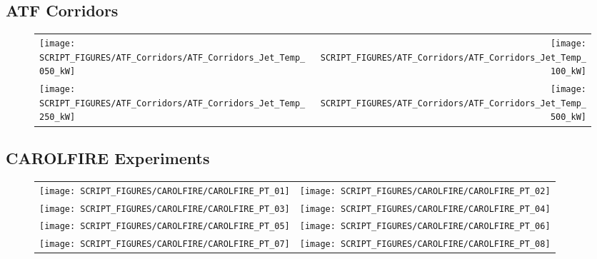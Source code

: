 

\subsection{ATF Corridors}

\begin{figure}[!ht]
\begin{tabular*}{\textwidth}{l@{\extracolsep{\fill}}r}
\texttt{[image: SCRIPT\_FIGURES/ATF\_Corridors/ATF\_Corridors\_Jet\_Temp\_050\_kW]} &
\texttt{[image: SCRIPT\_FIGURES/ATF\_Corridors/ATF\_Corridors\_Jet\_Temp\_100\_kW]} \\
\texttt{[image: SCRIPT\_FIGURES/ATF\_Corridors/ATF\_Corridors\_Jet\_Temp\_250\_kW]} &
\texttt{[image: SCRIPT\_FIGURES/ATF\_Corridors/ATF\_Corridors\_Jet\_Temp\_500\_kW]}
\end{tabular*}
\end{figure}

\clearpage

\subsection{CAROLFIRE Experiments}

\begin{figure}[!ht]
\begin{tabular*}{\textwidth}{l@{\extracolsep{\fill}}r}
\texttt{[image: SCRIPT\_FIGURES/CAROLFIRE/CAROLFIRE\_PT\_01]} &
\texttt{[image: SCRIPT\_FIGURES/CAROLFIRE/CAROLFIRE\_PT\_02]} \\
\texttt{[image: SCRIPT\_FIGURES/CAROLFIRE/CAROLFIRE\_PT\_03]} &
\texttt{[image: SCRIPT\_FIGURES/CAROLFIRE/CAROLFIRE\_PT\_04]} \\
\texttt{[image: SCRIPT\_FIGURES/CAROLFIRE/CAROLFIRE\_PT\_05]} &
\texttt{[image: SCRIPT\_FIGURES/CAROLFIRE/CAROLFIRE\_PT\_06]} \\
\texttt{[image: SCRIPT\_FIGURES/CAROLFIRE/CAROLFIRE\_PT\_07]} &
\texttt{[image: SCRIPT\_FIGURES/CAROLFIRE/CAROLFIRE\_PT\_08]}
\end{tabular*}
\end{figure}

